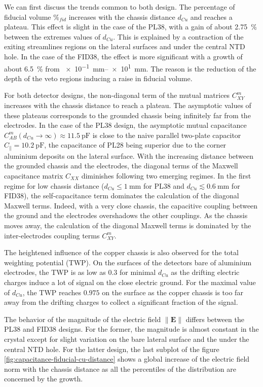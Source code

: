 We can first discuss the trends common to both design. 
The percentage of fiducial volume $\%_{fid}$ increases with the chassis distance $d_{Cu}$ and reaches a plateau. This effect is slight in the case of the PL38, with a gain of about \SI{2.75}{\percent} between the extremes values of $d_{Cu}$. This is explained by a contraction of the exiting streamlines regions on the lateral surfaces and under the central NTD hole. In the case of the FID38, the effect is more significant with a growth of about \SI{6.5}{\percent} from \SIrange{e-1}{e1}{\mm}. The reason is the reduction of the depth of the veto regions inducing a raise in fiducial volume.

For both detector designs, the non-diagonal term of the mutual matrices $C_{XY}^m$ increases with the chassis distance to reach a plateau. The asymptotic values of these plateaus corresponds to the grounded chassis being infinitely far from the electrodes. In the case of the PL38 design, the asymptotic mutual capacitance $C_{AB}^m(d_{Cu} \to \infty) \approx \SI{11.5}{\pico\farad}$ is close to the naive parallel two-plate capacitor $C_{\parallel} = \SI{10.2}{\pico\farad}$, the capacitance of PL28 being superior due to the corner aluminium deposits on the lateral surface. With the increasing distance between the grounded chassis and the electrodes, the diagonal terms of the Maxwell capacitance matrix $C_{XX}$ diminishes following two emerging regimes. In the first regime for low chassis distance ($d_{Cu} \leq \SI{1}{\mm}$ for PL38 and $d_{Cu} \lesssim \SI{0.6}{\mm}$ for FID38), the self-capacitance term dominates the calculation of the diagonal Maxwell terms. Indeed, with a very close chassis, the capacitive coupling between the ground and the electrodes overshadows the other couplings. As the chassis moves away, the calculation of the diagonal Maxwell terms is dominated by the inter-electrodes coupling terms $C_{XY}^m$. 

The heightened influence of the copper chassis is also observed for the total weighting potential (TWP). On the surfaces of the detectors bare of aluminium electrodes, the TWP is as low as $0.3$ for minimal $d_{Cu}$ as the drifting electric charges induce a lot of signal on the close electric ground. For the maximal value of $d_{Cu}$, the TWP reaches $0.975$ on the surface as the copper chassis is too far away from the drifting charges to collect a significant fraction of the signal.

The behavior of the magnitude of the electric field $\| \mathbf{E} \|$ differs between the PL38 and FID38 designs. For the former, the magnitude is almost constant in the crystal except for slight variation on the bare lateral surface and the under the central NTD hole. For the latter design, the last subplot of the figure \ref{fig:capacitance-fiducial-cu-distance} shows a global increase of the electric field norm with the chassis distance as all the percentiles of the distribution are concerned by the growth.

